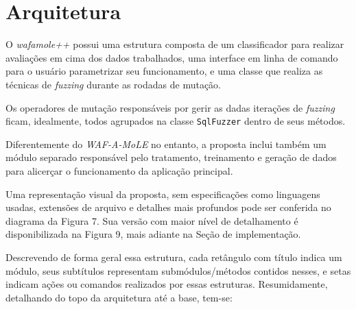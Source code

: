 \section{Arquitetura}

O \textit{wafamole++} possui uma estrutura composta de um classificador para realizar avaliações em cima dos dados trabalhados, uma interface em linha de comando para o usuário parametrizar seu funcionamento, e uma classe que realiza as técnicas de \textit{fuzzing} durante as rodadas de mutação.

Os operadores de mutação responsáveis por gerir as dadas iterações de \textit{fuzzing} ficam, idealmente, todos agrupados na classe \verb+SqlFuzzer+ dentro de seus métodos.

Diferentemente do \textit{WAF-A-MoLE} no entanto, a proposta inclui também um módulo separado responsável pelo tratamento, treinamento e geração de dados para alicerçar o funcionamento da aplicação principal. 

Uma representação visual da proposta, sem especificações como linguagens usadas, extensões de arquivo e detalhes mais profundos pode ser conferida no diagrama da Figura 7. Sua versão com maior nível de detalhamento é disponibilizada na Figura 9, mais adiante na Seção de implementação.

Descrevendo de forma geral essa estrutura, cada retângulo com título indica um módulo, seus subtítulos representam submódulos/métodos contidos nesses, e setas indicam ações ou comandos realizados por essas estruturas. Resumidamente, detalhando do topo da arquitetura até a base, tem-se:

